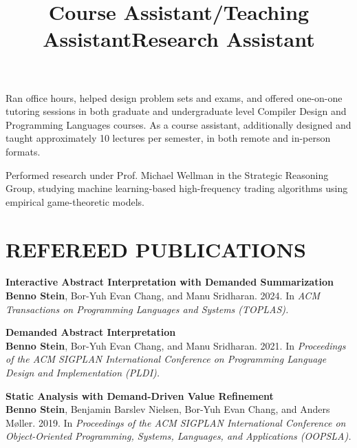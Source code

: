 \documentclass[margin,10pt]{res}
\begin{document}
\begin{resume}
\title{\textbf{Course Assistant}/\textbf{Teaching Assistant}}
\begin{position}
  Ran office hours, helped design problem sets and exams, and offered one-on-one tutoring sessions in both graduate and undergraduate level Compiler Design and Programming Languages courses.
  As a course assistant, additionally designed and taught approximately 10 lectures per semester, in both remote and in-person formats.
  \end{position}

\title{\textbf{Research Assistant}}
\begin{position}
Performed research under Prof. Michael Wellman in the Strategic Reasoning Group, studying machine learning-based high-frequency trading algorithms using empirical game-theoretic models.\end{position}

\section{REFEREED PUBLICATIONS}
{\bf Interactive Abstract Interpretation with Demanded Summarization}\\
{\bf Benno Stein}, Bor-Yuh Evan Chang, and Manu Sridharan.  2024. In {\em ACM Transactions on Programming Languages and Systems (TOPLAS).}\\\vspace{-1em}

{\bf Demanded Abstract Interpretation}\\
{\bf Benno Stein}, Bor-Yuh Evan Chang, and Manu Sridharan.  2021. In {\em Proceedings of the ACM SIGPLAN International Conference on Programming Language Design and Implementation (PLDI).}\\\vspace{-1em}

{\bf Static Analysis with Demand-Driven Value Refinement}\\
{\bf Benno Stein}, Benjamin Barslev Nielsen, Bor-Yuh Evan Chang, and Anders M\o{}ller. 2019. In {\em Proceedings of the ACM SIGPLAN International Conference on Object-Oriented Programming, Systems, Languages, and Applications (OOPSLA).}\\\vspace{-1em}


\end{resume}
\end{document}
